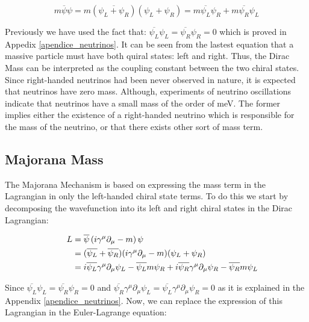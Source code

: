 \begin{equation}\label{Dirac mass term}
 m \overline{\psi} \psi = m \left( \overbar{\psi_L + \psi_R} \right) \left( \psi_L + \psi_R \right) = m \overline{\psi_L} \psi_R + m \overline{\psi_R}\psi_L
\end{equation} 

Previously we have used the fact that: $\overline{\psi_L}\psi_L = \overline{\psi_R}\psi_R = 0$ which is proved in Appedix \ref{apendice_neutrinos}. It can be seen from the lastest equation
that a massive particle must have both quiral states: left and right. Thus, the Dirac Mass can be interpreted as the coupling constant between the two chiral states. Since right-handed 
neutrinos had been never observed in nature, it is expected that neutrinos have zero mass. Although, experiments of neutrino oscillations indicate that neutrinos have a small mass of 
the order of meV. The former implies either the existence of a right-handed neutrino which is responsible for the mass of the neutrino, or that there exists other sort of mass term.

\subsection{Majorana Mass}

The Majorana Mechanism is based on expressing the mass term in the Lagrangian in only the left-handed chiral state terms.
To do this we start by decomposing the wavefunction into its left and right chiral states in the Dirac Lagrangian: 


\begin{align}
  \phantom{i = j = k}
  &\begin{aligned}
    \mathllap{L} &= \overline{\psi} \left( i \gamma ^\mu \partial_{\mu} - m \right) \psi \\
    \mathllap{}  &= (\overline{\psi_L} + \overline{\psi_R})( i \gamma ^\mu \partial_{\mu} - m)(\psi_L + \psi_R) \\
     \mathllap{} &= i \overline{\psi_L}\gamma^\mu\partial_\mu \psi_L - \overline{\psi_L} m \psi_R +
     i\overline{\psi_R}\gamma^\mu \partial_\mu \psi_R - \overline{\psi_R}m\psi_L
   &\end{aligned}
\end{align}

Since $\overline{\psi_L}\psi_L = \overline{\psi_R}\psi_R = 0$ and $\overline{\psi_R}\gamma^\mu \partial_\mu \psi_L = \overline{\psi_L}\gamma^\mu\partial_\mu \psi_R = 0$
as it is explained in the Appendix \ref{apendice_neutrinos}. Now, we can replace the expression of this Lagrangian in the Euler-Lagrange equation:

